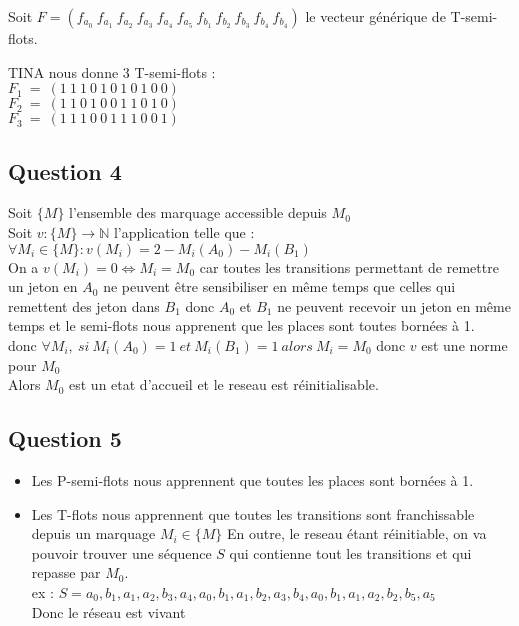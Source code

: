 Soit $F=(f_{a_0}\ f_{a_1}\ f_{a_2}\ f_{a_3}\ f_{a_4}\ f_{a_5}\ f_{b_1}\ f_{b_2}\ f_{b_3}\ f_{b_4}\ f_{b_4})$ le vecteur générique de T-semi-flots.

TINA nous donne 3 T-semi-flots :\\
$F_1\ =\ (1\ 1\ 1\ 0\ 1\ 0\ 1\ 0\ 1\ 0\ 0)$\\
$F_2\ =\ (1\ 1\ 0\ 1\ 0\ 0\ 1\ 1\ 0\ 1\ 0)$\\
$F_3\ =\ (1\ 1\ 1\ 0\ 0\ 1\ 1\ 1\ 0\ 0\ 1)$\\

\subsection{Question 4}

Soit $\{M\}$ l'ensemble des marquage accessible depuis $M_0$\\
Soit $v : \{M\} \rightarrow \mathbb{N}$ l'application telle que :\\
$\forall M_i \in \{M\} : v(M_i) = 2-M_i(A_0)-M_i(B_1)$\\
On a $v(M_i) = 0 \Leftrightarrow M_i = M_0$ car toutes les transitions permettant de remettre un jeton en $A_0$ ne peuvent être sensibiliser en même temps que celles qui remettent des jeton dans $B_1$ donc $A_0$ et $B_1$ ne peuvent recevoir un jeton en même temps et le semi-flots nous apprenent que les places sont toutes bornées à 1.\\
donc $\forall M_i,\ si\ M_i(A_0) =1\ et\ M_i(B_1) = 1\ alors\ M_i = M_0$ 
\vspace{0.5cm}
donc $v$ est une norme pour $M_0$ \\
Alors $M_0$ est un etat d'accueil et le reseau est réinitialisable.

\subsection{Question 5}

\begin{itemize}
\item Les P-semi-flots nous apprennent que toutes les places sont bornées à 1.
\item Les T-flots nous apprennent que toutes les transitions sont franchissable depuis un marquage $M_i \in \{M\}$
En outre, le reseau étant réinitiable, on va pouvoir trouver une séquence $S$ qui contienne tout les transitions et qui repasse par $M_0$.\\
ex : $S = a_0,b_1,a_1,a_2,b_3,a_4,a_0,b_1,a_1,b_2,a_3,b_4,a_0,b_1,a_1,a_2,b_2,b_5,a_5$\\
Donc le réseau est vivant
\end{itemize}
